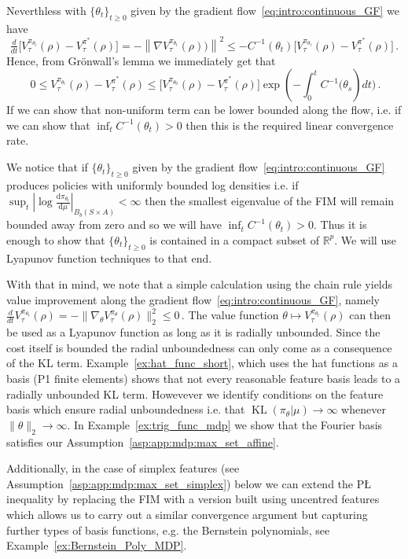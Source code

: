 \documentclass{amsart}
\theoremstyle{definition}
\begin{document}
Neverthless with $\{\theta_t\}_{t\geq 0}$ given by the gradient flow~\eqref{eq:intro:continuous_GF} we have
\[
\tfrac{d}{d t}\Big[V_\tau^{\pi_{\theta_t}}(\rho)-V_\tau^{\pi^*}(\rho)\Big]=-\left\|\nabla V_\tau^{\pi_{\theta_t}}(\rho))\right\|^2 \leq- C^{-1}\left(\theta_t\right)\Big[V_\tau^{\pi_{\theta_t}}(\rho)-V_\tau^{\pi^*}(\rho)\Big]\,.
\]
Hence, from Gr\"onwall's lemma we immediately get that
\[\
0 \leq V_\tau^{\pi_{\theta_t}}(\rho)-V_\tau^{\pi^*}(\rho) \leq\big[V_\tau^{\pi_{\theta_0}}(\rho)-V_\tau^{\pi^*}(\rho)\big] \exp \left(-\textstyle\int_0^t  C^{-1}\big(\theta_s\right) d t\big) \,.
\]
If we can show that non-uniform term can be lower bounded along the flow, i.e. if we can show that $\inf _t C^{-1}\left(\theta_t\right) > 0$ then this is the required linear convergence rate.

We notice that if $\{\theta_t\}_{t\geq 0}$ given by the gradient flow~\eqref{eq:intro:continuous_GF} produces policies with uniformly bounded log densities i.e. if $\sup_{t} |\log \frac{\mathrm d \pi_{\theta_t}}{\mathrm d\mu}|_{B_b(S\times A)} < \infty$ then the smallest eigenvalue of the FIM will remain bounded away from zero and so we will have $\inf_t C^{-1}\left(\theta_t\right) > 0$.
Thus it is enough to show that $\{\theta_t\}_{t\geq 0}$ is contained in a compact subset of $\mathbb R^p$.
We will use Lyapunov function techniques to that end.

With that in mind, we note that a simple calculation using the chain rule yields value improvement along the gradient flow~\eqref{eq:intro:continuous_GF}, namely
$
\frac{d}{dt}V^{\pi_{\theta_t}}_\tau(\rho) = - \|\nabla_\theta V^{\pi_\theta}_\tau(\rho)\|_2^2 \leq 0\,.
$
The value function $\theta \mapsto V^{\pi_{\theta_t}}_\tau(\rho)$ can then be used as a Lyapunov function as long as it is radially unbounded.
Since the cost itself is bounded the radial unboundedness can only come as a consequence of the KL term. 
Example~\ref{ex:hat_func_short}, which uses the hat functions as a basis (P1 finite elements) shows that not every reasonable feature basis leads to a radially unbounded KL term.
Howevever we identify conditions on the feature basis which ensure radial unboundedness i.e. that $\operatorname{KL}(\pi_\theta|\mu) \to \infty$ whenever $\|\theta\|_2 \to \infty$.
In Example~\ref{ex:trig_func_mdp} we show that the Fourier basis satisfies our Assumption~\ref{asp:app:mdp:max_set_affine}.

Additionally, in the case of simplex features (see Assumption~\ref{asp:app:mdp:max_set_simplex}) below we can extend the P{\L} inequality by replacing the FIM with a version built using uncentred features which allows us to carry out a similar convergence argument but capturing further types of basis functions, e.g. the Bernstein polynomials, see Example~\ref{ex:Bernstein_Poly_MDP}.
\end{document}
